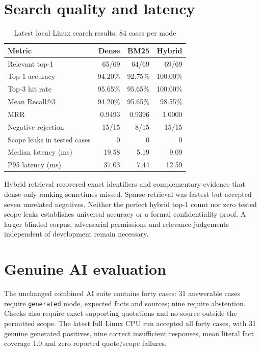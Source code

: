 \section{Search quality and latency}
\par\begin{table}[htbp]\caption{Latest local Linux search results, 84 cases per mode}\label{tab:search}\small\begin{tabularx}{\linewidth}{Yrrr}\toprule Metric&Dense&BM25&Hybrid\\\midrule
Relevant top-1&65/69&64/69&69/69\\
Top-1 accuracy&94.20\%&92.75\%&100.00\%\\
Top-3 hit rate&95.65\%&95.65\%&100.00\%\\
Mean Recall@3&94.20\%&95.65\%&98.55\%\\
MRR&0.9493&0.9396&1.0000\\
Negative rejection&15/15&8/15&15/15\\
Scope leaks in tested cases&0&0&0\\
Median latency (ms)&19.58&5.19&9.09\\
P95 latency (ms)&37.03&7.44&12.59\\\bottomrule\end{tabularx}\end{table}\par
Hybrid retrieval recovered exact identifiers and complementary evidence that dense-only ranking sometimes missed. Sparse retrieval was fastest but accepted seven unrelated negatives. Neither the perfect hybrid top-1 count nor zero tested scope leaks establishes universal accuracy or a formal confidentiality proof. A larger blinded corpus, adversarial permissions and relevance judgements independent of development remain necessary.
\section{Genuine AI evaluation}
The unchanged combined AI suite contains forty cases: 31 answerable cases require \texttt{generated} mode, expected facts and sources; nine require abstention. Checks also require exact supporting quotations and no source outside the permitted scope. The latest full Linux CPU run accepted all forty cases, with 31 genuine generated positives, nine correct insufficient responses, mean literal fact coverage 1.0 and zero reported quote/scope failures.

